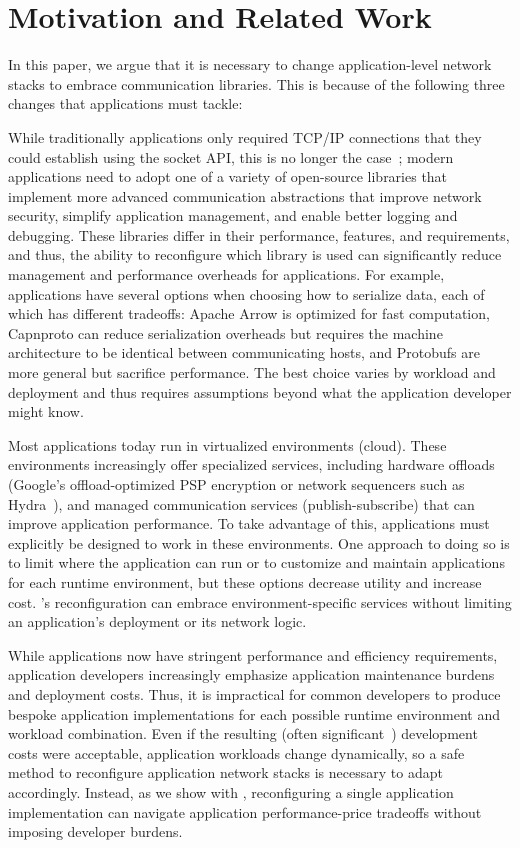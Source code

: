 \section{Motivation and Related Work}%
In this paper, we argue that it is necessary to change application-level network stacks to embrace communication libraries.
This is because of the following three changes that applications must tackle:

 While traditionally applications only required TCP/IP connections that they could establish using the socket API, this is no longer the case~\cite{http-narrow-waist}; modern applications need to adopt one of a variety of open-source libraries that implement more advanced communication abstractions that improve network security, simplify application management, and enable better logging and debugging. These libraries differ in their performance, features, and requirements, and thus, the ability to reconfigure which library is used can significantly reduce management and performance overheads for applications.
For example, applications have several options when choosing how to serialize data, each of which has different tradeoffs:
Apache Arrow is optimized for fast computation, Capnproto can reduce serialization overheads but requires the machine architecture to be identical between communicating hosts, and Protobufs are more general but sacrifice performance. The best choice varies by workload and deployment and thus requires assumptions beyond what the application developer might know.

 Most applications today run in virtualized environments (\eg cloud). These environments increasingly offer specialized services, including hardware offloads (\eg Google's offload-optimized PSP encryption or network sequencers such as Hydra~\cite{hydra}), and managed communication services (\eg publish-subscribe) that can improve application performance. To take advantage of this, applications must explicitly be designed to work in these environments. One approach to doing so is to limit where the application can run or to customize and maintain applications for each runtime environment, but these options decrease utility and increase cost. \name's reconfiguration can embrace environment-specific services without limiting an application's deployment or its network logic.

While applications now have stringent performance and efficiency requirements, application developers increasingly emphasize application maintenance burdens and deployment costs. 
Thus, it is impractical for common developers to produce bespoke application implementations for each possible runtime environment and workload combination. Even if the resulting (often significant~\cite{sqs-to-kafka}) development costs were acceptable, application workloads change dynamically, so a safe method to reconfigure application network stacks is necessary to adapt accordingly. Instead, as we show with \name, reconfiguring a single application implementation can navigate application performance-price tradeoffs without imposing developer burdens. 

